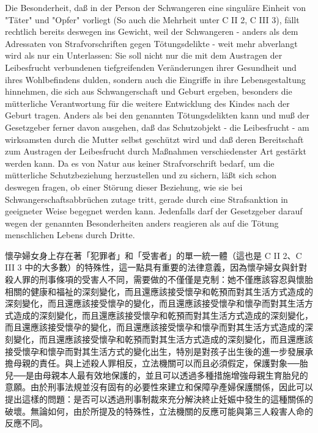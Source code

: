 \documentclass[12pt]{article}
\begin{document}
\syncleft
\begin{sourcepara}
Die Besonderheit, daß in der Person der Schwangeren eine singuläre Einheit von "Täter" und "Opfer" vorliegt (So auch die Mehrheit unter C II 2, C III 3), fällt rechtlich bereits deswegen ins Gewicht, weil der Schwangeren - anders als dem Adressaten von Strafvorschriften gegen Tötungsdelikte - weit mehr abverlangt wird als nur ein Unterlassen: Sie soll nicht nur die mit dem Austragen der Leibesfrucht verbundenen tiefgreifenden Veränderungen ihrer Gesundheit und ihres Wohlbefindens dulden, sondern auch die Eingriffe in ihre Lebensgestaltung hinnehmen, die sich aus Schwangerschaft und Geburt ergeben, besonders die mütterliche Verantwortung für die weitere Entwicklung des Kindes nach der Geburt tragen. Anders als bei den genannten Tötungsdelikten kann und muß der Gesetzgeber ferner davon ausgehen, daß das Schutzobjekt - die Leibesfrucht - am wirksamsten durch die Mutter selbst geschützt wird und daß deren Bereitschaft zum Austragen der Leibesfrucht durch Maßnahmen verschiedenster Art gestärkt werden kann. Da es von Natur aus keiner Strafvorschrift bedarf, um die mütterliche Schutzbeziehung herzustellen und zu sichern, läßt sich schon deswegen fragen, ob einer Störung dieser Beziehung, wie sie bei Schwangerschaftsabbrüchen zutage tritt, gerade durch eine Strafsanktion in geeigneter Weise begegnet werden kann. Jedenfalls darf der Gesetzgeber darauf wegen der genannten Besonderheiten anders reagieren als auf die Tötung menschlichen Lebens durch Dritte.
\end{sourcepara}
\begin{transpara}
懷孕婦女身上存在著「犯罪者」和「受害者」的單一統一體（這也是 C II 2、C III 3 中的大多數）的特殊性，這一點具有重要的法律意義，因為懷孕婦女與針對殺人罪的刑事條項的受害人不同，需要做的不僅僅是克制：她不僅應該容忍與懷胎相關的健康和福祉的深刻變化，而且還應該接受懷孕和乾預而對其生活方式造成的深刻變化，而且還應該接受懷孕的變化，而且還應該接受懷孕和懷孕而對其生活方式造成的深刻變化，而且還應該接受懷孕和乾預而對其生活方式造成的深刻變化，而且還應該接受懷孕的變化，而且還應該接受懷孕和懷孕而對其生活方式造成的深刻變化，而且還應該接受懷孕和乾預而對其生活方式造成的深刻變化，而且還應該接受懷孕和懷孕而對其生活方式的變化出生，特別是對孩子出生後的進一步發展承擔母親的責任。與上述殺人罪相反，立法機關可以而且必須假定，保護對象──胎兒──是由母親本人最有效地保護的，並且可以透過多種措施增強母親生育胎兒的意願。由於刑事法規並沒有固有的必要性來建立和保障孕產婦保護關係，因此可以提出這樣的問題：是否可以透過刑事制裁來充分解決終止妊娠中發生的這種關係的破壞。無論如何，由於所提及的特殊性，立法機關的反應可能與第三人殺害人命的反應不同。
\end{transpara}
\end{document}
